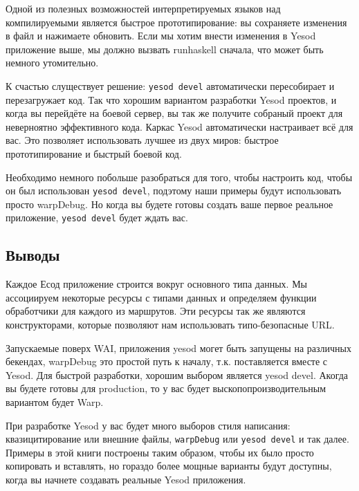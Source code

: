 Одной из полезных возможностей интерпретируемых языков над компилируемыми является быстрое прототипирование: 
вы сохраняете изменения в файл и нажимаете обновить. Если мы хотим внести изменения в Yesod
приложение выше, мы должно вызвать runhaskell сначала, что может быть немного утомительно.

К счастью слуществует решение: \lstinline'yesod devel' автоматически пересобирает и перезагружает
код. Так что хорошим вариантом разработки Yesod проектов, и когда вы перейдёте на боевой сервер,
вы так же получите собраный проект для неверноятно эффективного кода. Каркас Yesod автоматически
настраивает всё для вас. Это позволяет использовать лучшее из двух миров: быстрое прототипирование 
и быстрый боевой код.

Необходимо немного побольше разобраться для того, чтобы настроить код, чтобы он был использован
\lstinline'yesod devel', подэтому наши примеры будут использовать просто warpDebug. Но когда вы будете готовы
создать ваше первое реальное приложение, \lstinline'yesod devel' будет ждать вас.

\subsection{Выводы}

Каждое Есод приложение строится вокруг основного типа данных. Мы ассоциируем некоторые ресурсы
с типами данных и определяем функции обработчики для каждого из маршрутов. Эти ресурсы так же
являются конструкторами, которые позволяют нам использовать типо-безопасные URL.

Запускаемые поверх WAI, приложения yesod могет быть запущены на различных бекендах, warpDebug
это простой путь к началу, т.к. поставляется вместе с Yesod. Для быстрой разработки, хорошим
выбором является yesod devel. Акогда вы будете готовы для production, то у вас будет выскопопроизводительным
вариантом будет Warp.

При разработке Yesod у вас будет много выборов стиля написания: квазицитирование или внешние файлы,
\lstinline'warpDebug' или \lstinline'yesod devel' и так далее. Примеры в этой книги построены 
таким образом, чтобы их было просто копировать и вставлять, но гораздо более мощные варианты 
будут доступны, когда вы начнете создавать реальные Yesod приложения.
